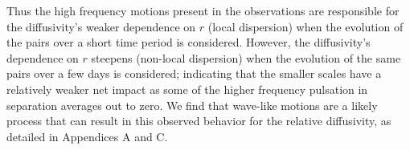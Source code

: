 \documentclass[]{ametsoc}
\begin{document}
Thus the high frequency motions present in the observations are responsible for the diffusivity's weaker dependence on $r$ (local dispersion) when the evolution of the pairs over a short time period is considered. However, the diffusivity's dependence on $r$ steepens (non-local dispersion) when the evolution of the same pairs over a few days is considered; indicating that the smaller scales have a relatively weaker net impact as some of the higher frequency pulsation in separation averages out to zero. We find that wave-like motions are a likely process that can result in this observed behavior for the relative diffusivity, as detailed in Appendices A and C. 
\end{document}
